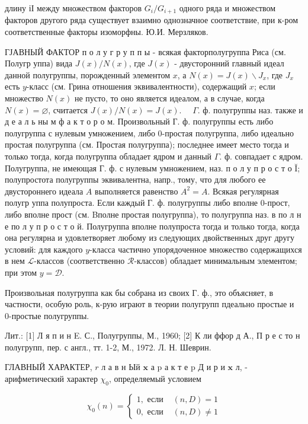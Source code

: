 \documentclass[10pt]{article}
\begin{document}
длину іІ между множеством факторов $G_{i} / G_{i+1}$ одного ряда и множеством факторов другого ряда существует взаимно однозначное соответствие, при к-ром соответственные факторы изоморфны. Ю.И. Мерзляков.



ГЈАВНЫЙ ФАКТОР п о л у г р у п п ы - всякая факторполугруппа Риса (см. Полугр уппа) вида $J(x) / N(x)$, где $J(x)$ - двусторонний главный идеал данной полугруппы, порожденный элементом $x$, а $N(x)=J(x) \backslash J_{x}$, где $J_{x}$ есть $y$-класс (см. Грина отношения эквивалентности), содержащий $x$; если множество $N(x)$ не пусто, то оно является идеалом, а в случае, когда $N(x)=\varnothing$, считается $J(x) / N(x)=J(x)$. $\quad \Gamma$. ф. полугруппы наз. также и д е а л ь ны м ф а к т о р о м. Произвольный Г. ф. полугруппы есть либо полугруппа с нулевым умножением, либо 0-простая полугруппа, либо идеально простая полугруппа (см. Простая полугруппа); последнее имеет место тогда и только тогда, когда полугруппа обладает ядром и данный $\Gamma$. ф. совпадает с ядром. Полугруппа, не имеющая Г. ф. с нулевым умножением, наз. п о л у п р о с т о Ĭ; полупростота полугруппы эквивалентна, напр., тому, что для любого ее двустороннего идеала $A$ выполняется равенство $A^{2}=A$. Всякая регулярная полугр уппа полупроста. Если каждый Г. ф. полугруппы либо вполне 0-прост, либо вполне прост (см. Bполне простая полугруппа), то полугруппа наз. в по л н е по л у п р о с т о й. Полугруппа вполне полупроста тогда и только тогда, когда она регулярна и удовлетворяет любому из следующих двойственных друг другу условий: для каждого $y$-класса частично упорядоченное множество содержащихся в нем $\mathscr{L}$-классов (соответственно $\mathscr{R}$-классов) обладает минимальным элементом; при этом $y=\mathscr{D}$.



Произвольная полугруппа как бы собрана из своих Г. ф., это объясняет, в частности, особую роль, к-рую играют в теории полугрупп пдеально простые и 0-простые полугруппы.



Лит.: [1] Л я п и н E. С., Полугруппы, М., 1960; [2] К ли ффор д А., П р е с то н полугрупп, пер. с англ., тт. 1-2, М., 1972. Л. Н. Шеврин.



ГЛАВНЫЙ ХАРАКТЕР, $r$ л а в н Ый $\mathbf{x}$ а p а к т е p Д и р и $\mathbf{x}$ л, - арифметический характер $\chi_{0}$, определяемый условием



\[

\chi_{0}(n)= \begin{cases}1, \text { если } & (n, D)=1 \\ 0, \text { если } & (n, D) \neq 1\end{cases}

\]
\end{document}
